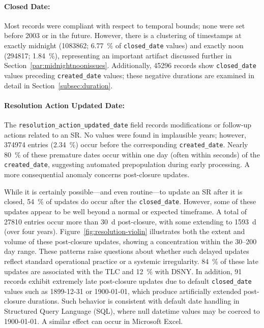 \documentclass[linenumber]{jdsart}
\begin{document}
\paragraph{Closed Date:}
\label{par:closeddate}
Most records were compliant with respect to temporal bounds;
none were set before 2003 or in the future.
However, there is a clustering of timestamps at exactly midnight
(\num{1083862};
\SI[round-mode=places, round-precision=2]{6.77}{\percent}
of \texttt{closed\_date} values) and exactly noon
(\num{294817};
\SI[round-mode=places, round-precision=2]{1.84}{\percent}),
representing an important artifact discussed further in
Section~\ref{par:midnightnoonissues}.
Additionally, \num{45296} records show
\texttt{closed\_date} values preceding
\texttt{created\_date} values;
these negative durations are examined in detail in
Section~\ref{subsec:duration}.


\paragraph{Resolution Action Updated Date:}
\label{par:resolutionupdatedate}
The \texttt{resolution\_action\_updated\_date} field records modifications or
follow-up actions related to an SR. No values were found in implausible years; however,
\num{374974} entries (\SI[round-mode=places, round-precision=2]{2.34}{\percent})
occur before the corresponding \texttt{created\_date}.
Nearly \SI{80}{\percent} of these premature dates occur within
one day (often within seconds) of the \texttt{created\_date},
suggesting automated prepopulation during early processing.
A more consequential anomaly concerns post-closure updates.

While it is certainly possible---and even routine---to 
update an SR after it is closed, 
\SI[round-precision=0]{54}{\percent} of updates
do occur after the \texttt{closed\_date}.
However, some of these updates appear to be 
well beyond a normal or expected timeframe. A total of \num{27810} 
entries occur more than \SI{30}{\day} post-closure, with some extending to
\SI{1593}{\day} (over four years). Figure~\ref{fig:resolution-violin} 
illustrates both the extent and volume of these post-closure updates,
showing a concentration within the 30--200 day range. These patterns raise 
questions about whether such delayed updates reflect standard 
operational practice or a systemic irregularity. \SI{84}{\percent} of these 
late updates are associated with the TLC and \SI{12}{\percent} with 
DSNY. In addition, \num{91} records exhibit extremely late
post-closure updates due to default \texttt{closed\_date}
values such as 1899-12-31 or 1900-01-01, which produce
artificially extended post-closure durations.
 Such behavior is consistent 
with default date handling in Structured Query Language 
(SQL), where null datetime values may be coerced to 1900-01-01. 
A similar effect can occur in Microsoft Excel.
\end{document}
